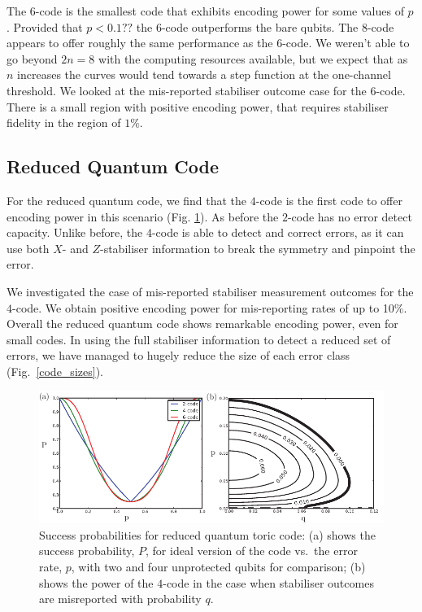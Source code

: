 The $6$-code is the smallest code that exhibits encoding power for some values of $p$. Provided that $p < 0.1??$ the $6$-code outperforms the bare qubits. The $8$-code appears to offer roughly the same performance as the $6$-code. We weren't able to go beyond $2n=8$ with the computing resources available, but we expect that as $n$ increases the curves would tend towards a step function at the one-channel threshold.  We looked at the mis-reported stabiliser outcome case for the $6$-code. There is a small region with positive encoding power, that requires stabiliser fidelity in the region of $1\%$.

\subsection{Reduced Quantum Code}

For the reduced quantum code, we find that the $4$-code is the first code to offer encoding power in this scenario (Fig. \ref{y_results}). As before the $2$-code has no error detect capacity. Unlike before, the $4$-code is able to detect and correct errors, as it can use both $X$- and $Z$-stabiliser information to break the symmetry and pinpoint the error. 

We investigated the case of mis-reported stabiliser measurement outcomes for the $4$-code. We obtain positive encoding power for mis-reporting rates of up to 10\%. Overall the reduced quantum code shows remarkable encoding power, even for small codes. In using the full stabiliser information to detect a reduced set of errors, we have managed to hugely reduce the size of each error class (Fig.~\ref{code_sizes}). 
\begin{figure}[htb]
  \begin{center}
    \includegraphics{assets/y_results.pdf}
  \end{center}
  \caption{Success probabilities for reduced quantum toric code: (a) shows the success probability, $P$, for ideal version of the code vs.\ the error rate, $p$, with two and four unprotected qubits for comparison; (b) shows the power of the $4$-code in the case when stabiliser outcomes are misreported with probability $q$.}
  \label{y_results}
\end{figure}

